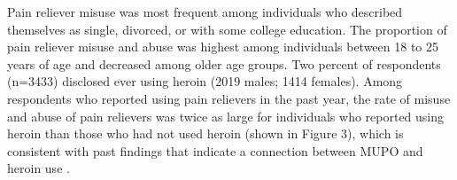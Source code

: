 \documentclass[sigconf]{acmart}
\begin{document}
Pain reliever misuse was most frequent among individuals who described 
themselves as single, divorced, or with some college education. The 
proportion of pain reliever misuse and abuse was highest among individuals 
between 18 to 25 years of age and decreased among older age groups. Two 
percent of respondents (n=3433) disclosed ever using heroin (2019 males; 
1414 females). Among respondents who reported using pain relievers in the 
past year, the rate of misuse and abuse of pain relievers was twice as 
large for individuals who reported using heroin than those who had not 
used heroin (shown in Figure 3), which is consistent with past findings 
that indicate a connection between MUPO and heroin use 
\cite{muhuri13, unick13}.










\end{document}

